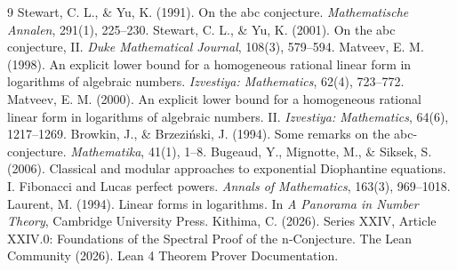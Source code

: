\documentclass[11pt,a4paper]{article}
\begin{document}

\begin{thebibliography}{9}
  Stewart, C. L., \& Yu, K. (1991). On the abc conjecture. \emph{Mathematische Annalen}, 291(1), 225–230.
  Stewart, C. L., \& Yu, K. (2001). On the abc conjecture, II. \emph{Duke Mathematical Journal}, 108(3), 579–594.
  Matveev, E. M. (1998). An explicit lower bound for a homogeneous rational linear form in logarithms of algebraic numbers. \emph{Izvestiya: Mathematics}, 62(4), 723–772.
  Matveev, E. M. (2000). An explicit lower bound for a homogeneous rational linear form in logarithms of algebraic numbers. II. \emph{Izvestiya: Mathematics}, 64(6), 1217–1269.
  Browkin, J., \& Brzeziński, J. (1994). Some remarks on the abc-conjecture. \emph{Mathematika}, 41(1), 1–8.
  Bugeaud, Y., Mignotte, M., \& Siksek, S. (2006). Classical and modular approaches to exponential Diophantine equations. I. Fibonacci and Lucas perfect powers. \emph{Annals of Mathematics}, 163(3), 969–1018.
  Laurent, M. (1994). Linear forms in logarithms. In \emph{A Panorama in Number Theory}, Cambridge University Press.
  Kithima, C. (2026). Series XXIV, Article XXIV.0: Foundations of the Spectral Proof of the n‑Conjecture.
  The Lean Community (2026). Lean 4 Theorem Prover Documentation.
\end{thebibliography}
\end{document}
